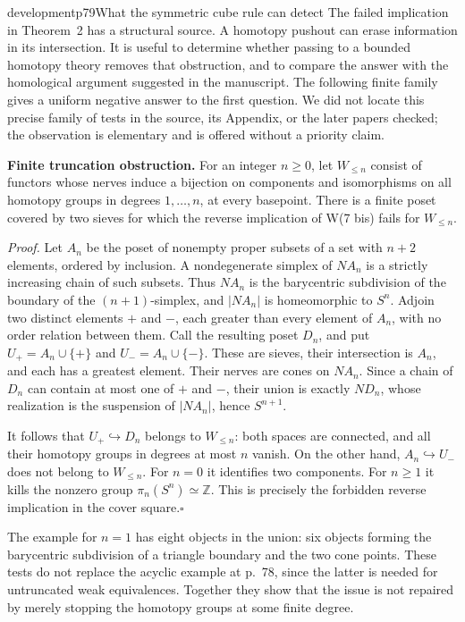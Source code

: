 \begin{dcomment}{development}{p79}{What the symmetric cube rule can detect}
The failed implication in Theorem~2 has a structural source. A homotopy pushout can erase information in its intersection. It is useful to determine whether passing to a bounded homotopy theory removes that obstruction, and to compare the answer with the homological argument suggested in the manuscript. The following finite family gives a uniform negative answer to the first question. We did not locate this precise family of tests in the source, its Appendix, or the later papers checked; the observation is elementary and is offered without a priority claim.

\textbf{Finite truncation obstruction.}\ours\quad
For an integer $n\geq0$, let $W_{\leq n}$ consist of functors whose nerves induce a bijection on components and isomorphisms on all homotopy groups in degrees $1,\ldots,n$, at every basepoint. There is a finite poset covered by two sieves for which the reverse implication of W(7 bis) fails for $W_{\leq n}$.

\emph{Proof.} Let $A_n$ be the poset of nonempty proper subsets of a set with $n+2$ elements, ordered by inclusion. A nondegenerate simplex of $NA_n$ is a strictly increasing chain of such subsets. Thus $NA_n$ is the barycentric subdivision of the boundary of the $(n+1)$-simplex, and $|NA_n|$ is homeomorphic to $S^n$. Adjoin two distinct elements $+$ and $-$, each greater than every element of $A_n$, with no order relation between them. Call the resulting poset $D_n$, and put $U_+=A_n\cup\{+\}$ and $U_-=A_n\cup\{-\}$. These are sieves, their intersection is $A_n$, and each has a greatest element. Their nerves are cones on $NA_n$. Since a chain of $D_n$ can contain at most one of $+$ and $-$, their union is exactly $ND_n$, whose realization is the suspension of $|NA_n|$, hence $S^{n+1}$.

It follows that $U_+\hookrightarrow D_n$ belongs to $W_{\leq n}$: both spaces are connected, and all their homotopy groups in degrees at most $n$ vanish. On the other hand, $A_n\hookrightarrow U_-$ does not belong to $W_{\leq n}$. For $n=0$ it identifies two components. For $n\geq1$ it kills the nonzero group $\pi_n(S^n)\simeq\mathbb Z$. This is precisely the forbidden reverse implication in the cover square.\hfill$\square$

The example for $n=1$ has eight objects in the union: six objects forming the barycentric subdivision of a triangle boundary and the two cone points. These tests do not replace the acyclic example at p.~78, since the latter is needed for untruncated weak equivalences. Together they show that the issue is not repaired by merely stopping the homotopy groups at some finite degree.


\end{dcomment}
